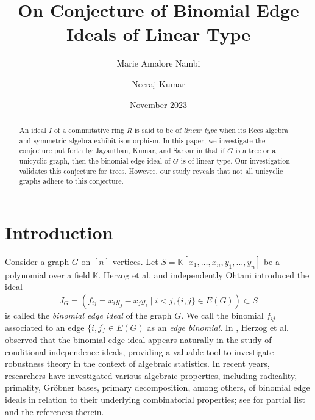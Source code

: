 \documentclass[11pt,a4paper,reqno]{amsart}
\author[Marie Amalore Nambi]{Marie Amalore Nambi}
\author[Neeraj Kumar]{Neeraj Kumar}
\title{On Conjecture of Binomial Edge Ideals of Linear Type}
\date{November 2023}
\theoremstyle{definition}
\begin{document}

\date{}

\begin{abstract}
An ideal $I$ of a commutative ring $R$ is said to be of {\emph{linear type}} when its Rees algebra and symmetric algebra exhibit isomorphism. In this paper, we investigate the conjecture put forth by Jayanthan, Kumar, and Sarkar in \cite{JAR2021} that if $G$ is a tree or a unicyclic graph, then the binomial edge ideal of $G$ is of linear type. Our investigation validates this conjecture for trees. However, our study reveals that not all unicyclic graphs adhere to this conjecture. 
\end{abstract}

\maketitle

\section*{Introduction}

 Consider a graph $G$ on $[n]$ vertices. Let $S=\mathbb{K}[x_1,\ldots,x_n,y_1,\ldots,y_n]$ be a polynomial over a field $\mathbb{K}$. Herzog et al. \cite{HH} and independently Ohtani \cite{O2011} introduced the ideal $$J_G=(f_{ij} = x_iy_j-x_jy_i \mid i<j, \{i,j\} \in E(G)) \subset S$$ is called the \textit{binomial edge ideal} of the graph $G$. We call the binomial $f_{ij}$ associated to an edge $\{i,j\} \in E(G)$ as an \textit{edge binomial}. In \cite{HH}, Herzog et al. observed that the binomial edge ideal appears naturally in the study of conditional independence ideals, providing a valuable tool to investigate robustness theory in the context of algebraic statistics. In recent years, researchers have investigated various algebraic properties, including radicality, primality, Gr\"{o}bner bases, primary decomposition, among others, of binomial edge ideals in relation to their underlying combinatorial properties; see for partial list \cite{VRT2021, HH, MS, O2011, SK} and the references therein. 
 
\end{document}
